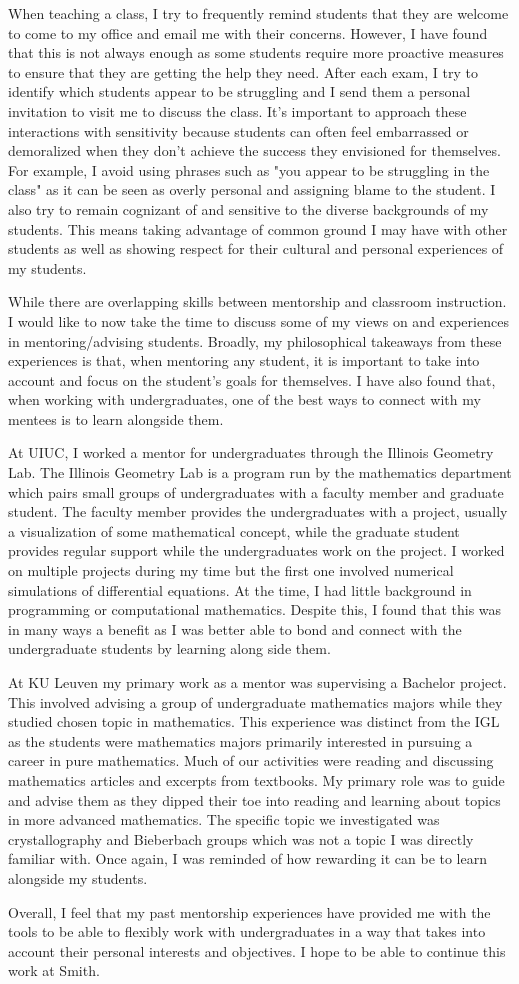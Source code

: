 \documentclass{article}
\begin{document}
When teaching a class, I try to frequently remind students that they are welcome to come to my office and email me with their concerns.
However, I have found that this is not always enough as some students require more proactive measures to ensure that they are getting the help they need. After each exam, I try to identify which students appear to be struggling and I send them a personal invitation to visit me to discuss the class. It's important to approach these interactions with sensitivity because students can often feel embarrassed or demoralized when they don't achieve the success they envisioned for themselves. For example, I avoid using phrases such as "you appear to be struggling in the class" as it can be seen as overly personal and assigning blame to the student. I also try to remain cognizant of and sensitive to the diverse backgrounds of my students.
This means taking advantage of common ground I may have with other students as well as showing respect for their cultural and personal experiences of my students.

While there are overlapping skills between mentorship and classroom instruction. I would like to now take the time to discuss some of my views on and experiences in mentoring/advising students. Broadly, my philosophical takeaways from these experiences is that, when mentoring any student, it is important to take into account and focus on the student's goals for themselves. I have also found that, when working with undergraduates, one of the best ways to connect with my mentees is to learn alongside them.

At UIUC, I worked a mentor for undergraduates through the Illinois Geometry Lab. The Illinois Geometry Lab is a program run by the mathematics department which pairs small groups of undergraduates with a faculty member and graduate student. The faculty member provides the undergraduates with a project, usually a visualization of some mathematical concept, while the graduate student provides regular support while the undergraduates work on the project. I worked on multiple projects during my time but the first one involved numerical simulations of differential equations. At the time, I had little background in programming or computational mathematics. Despite this, I found that this was in many ways a benefit as I was better able to bond and connect with the undergraduate students by learning along side them. 

At KU Leuven my primary work as a mentor was supervising a Bachelor project. This involved advising a group of undergraduate mathematics majors while they studied chosen topic in mathematics. This experience was distinct from the IGL as the students were mathematics majors primarily interested in pursuing a career in pure mathematics. Much of our activities were reading and discussing mathematics articles and excerpts from textbooks. My primary role was to guide and advise them as they dipped their toe into reading and learning about topics in more advanced mathematics. The specific topic we investigated was crystallography and Bieberbach groups which was not a topic I was directly familiar with. Once again, I was reminded of how rewarding it can be to learn alongside my students.

Overall, I feel that my past mentorship experiences have provided me with the tools to be able to flexibly work with undergraduates in a way that takes into account their personal interests and objectives. I hope to be able  to continue this work at Smith.
\end{document}
